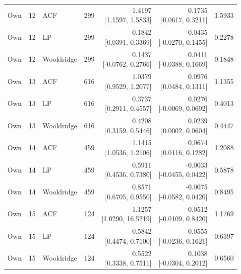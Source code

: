 \begin{longtable}{lllrrrr}
Own & 12 & ACF & 299 & \makecell{1.4197\\{[1.1597, 1.5833]}} & \makecell{0.1735\\{[0.0617, 0.3211]}} & 1.5933 \\
Own & 12 & LP & 299 & \makecell{0.1842\\{[0.0391, 0.3369]}} & \makecell{0.0435\\{[-0.0270, 0.1455]}} & 0.2278 \\
Own & 12 & Wooldridge & 299 & \makecell{0.1437\\{[-0.0762, 0.2766]}} & \makecell{0.0411\\{[-0.0388, 0.1669]}} & 0.1848 \\
Own & 13 & ACF & 616 & \makecell{1.0379\\{[0.9529, 1.2077]}} & \makecell{0.0976\\{[0.0484, 0.1311]}} & 1.1355 \\
Own & 13 & LP & 616 & \makecell{0.3737\\{[0.2911, 0.4557]}} & \makecell{0.0276\\{[-0.0069, 0.0692]}} & 0.4013 \\
Own & 13 & Wooldridge & 616 & \makecell{0.4208\\{[0.3159, 0.5446]}} & \makecell{0.0239\\{[0.0002, 0.0604]}} & 0.4447 \\
Own & 14 & ACF & 459 & \makecell{1.1415\\{[1.0536, 1.2106]}} & \makecell{0.0674\\{[0.0116, 0.1282]}} & 1.2088 \\
Own & 14 & LP & 459 & \makecell{0.5911\\{[0.4536, 0.7380]}} & \makecell{-0.0033\\{[-0.0455, 0.0422]}} & 0.5878 \\
Own & 14 & Wooldridge & 459 & \makecell{0.8571\\{[0.6705, 0.9550]}} & \makecell{-0.0075\\{[-0.0582, 0.0420]}} & 0.8495 \\
Own & 15 & ACF & 124 & \makecell{1.1257\\{[1.0290, 16.5219]}} & \makecell{0.0512\\{[-0.0109, 0.8420]}} & 1.1769 \\
Own & 15 & LP & 124 & \makecell{0.5842\\{[0.4474, 0.7100]}} & \makecell{0.0555\\{[-0.0236, 0.1621]}} & 0.6397 \\
Own & 15 & Wooldridge & 124 & \makecell{0.5522\\{[0.3338, 0.7511]}} & \makecell{0.1038\\{[-0.0304, 0.2012]}} & 0.6560 \\

\end{longtable}
